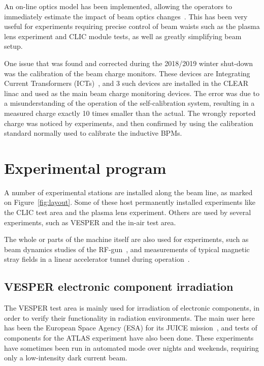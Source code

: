 \documentclass[a4paper,
               keeplastbox,   %
               ]{jacow}
\begin{document}

An on-line optics model has been implemented, allowing the operators to immediately estimate the impact of beam optics changes~\cite{Erik::CLEARrev}.
This has been very useful for experiments requiring precise control of beam waists such as the plasma lens experiment and CLIC module tests, as well as greatly simplifying beam setup.

One issue that was found and corrected during the  2018/2019 winter shut-down was the calibration of the beam charge monitors.
These devices are Integrating Current Transformers (ICTs)~\cite{BergozICT}, and 3 such devices are installed in the CLEAR linac and used as the main beam charge monitoring devices.
The error was due to a misunderstanding of the operation of the self-calibration system, resulting in a measured charge exactly 10 times smaller than the actual.
The wrongly reported charge was noticed by experiments, and then confirmed by using the calibration standard normally used to calibrate the inductive BPMs.

\section{Experimental program}
A number of experimental stations are installed along the beam line, as marked on Figure~\ref{fig:layout}.
Some of these host permanently installed experiments like the CLIC test area and the plasma lens experiment.
Others are used by several experiments, such as VESPER and the in-air test area.

The whole or parts of the machine itself are also used for experiments, such as beam dynamics studies of the RF-gun~\cite{LucaGun}, and measurements of typical magnetic stray fields in a linear accelerator tunnel during operation~\cite{Gohil:IPAC19-MOPGW081}.

\subsection{VESPER electronic component irradiation}
The VESPER test area is mainly used for irradiation of electronic components, in order to verify their functionality in radiation environments.
The main user here has been the European Space Agency (ESA) for its JUICE mission~\cite{MarisTali:E-SEU,MarisTali:E-SEL,RubenAlia::CLEARrev}, and tests of components for the ATLAS experiment have also been done.
These experiments have sometimes been run in automated mode over nights and weekends, requiring only a low-intensity dark current beam.
\end{document}
